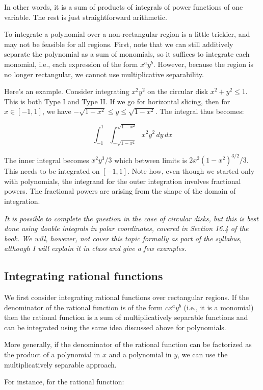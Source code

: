 \documentclass[10pt]{amsart}
\begin{document}
In other words, it is a sum of products of integrals of power
functions of one variable. The rest is just straightforward arithmetic.

To integrate a polynomial over a non-rectangular region is a little
trickier, and may not be feasible for all regions. First, note that we
can still additively separate the polynomial as a sum of monomials, so
it suffices to integrate each monomial, i.e., each expression of the
form $x^ay^b$. However, because the region is no longer rectangular,
we cannot use multiplicative separability.

Here's an example. Consider integrating $x^2y^2$ on the circular disk
$x^2 + y^2 \le 1$. This is both Type I and Type II. If we go for
horizontal slicing, then for $x \in [-1,1]$, we have $-\sqrt{1 - x^2}
\le y \le \sqrt{1 - x^2}$. The integral thus becomes:

$$\int_{-1}^1 \int_{-\sqrt{1 - x^2}}^{\sqrt{1 - x^2}} x^2y^2 \, dy \, dx$$

The inner integral becomes $x^2y^3/3$ which between limits is $2x^2(1
- x^2)^{3/2}/3$. This needs to be integrated on $[-1,1]$. Note how,
even though we started only with polynomials, the integrand for the
outer integration involves fractional powers. The fractional powers
are arising from the shape of the domain of integration.

{\em It is possible to complete the question in the case of circular
disks, but this is best done using double integrals in polar
coordinates, covered in Section 16.4 of the book. We will, however,
not cover this topic formally as part of the syllabus, although I will
explain it in class and give a few examples.}
\subsection{Integrating rational functions}

We first consider integrating rational functions over rectangular
regions. If the denominator of the rational function is of the form
$cx^ay^b$ (i.e., it is a monomial) then the rational function is a sum
of multiplicatively separable functions and can be integrated using the
same idea discussed above for polynomials.

More generally, if the denominator of the rational function can be
factorized as the product of a polynomial in $x$ and a polynomial in
$y$, we can use the multiplicatively separable approach.

For instance, for the rational function:
\end{document}
